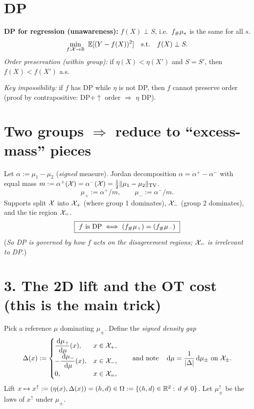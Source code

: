 \documentclass[11pt]{article}
\begin{document}
\section{DP}
\textbf{DP for regression (unawareness):} $f(X)\perp S$,
i.e.\ $f_{\#}\mu_s$ is the same for all $s$.
\begin{equation}
\min_{f:\X\to\R}\ \E[(Y-f(X))^2]\quad\text{s.t.}\quad f(X)\perp S.
\end{equation}
\emph{Order preservation (within group):} if $\eta(X)<\eta(X')$ and $S=S'$, then $f(X)<f(X')$ a.s.

\medskip
\textit{Key impossibility:} if $f$ has DP while $\eta$ is not DP, then $f$ cannot preserve order (proof by contrapositive: DP+$\uparrow$ order $\Rightarrow$ $\eta$ DP).

\section{Two groups $\Rightarrow$ reduce to ``excess-mass'' pieces}
Let $\alpha:=\mu_1-\mu_2$ (\emph{signed} measure). Jordan decomposition $\alpha=\alpha^+-\alpha^-$ with equal mass $m:=\alpha^+(\mathcal{X})=\alpha^-(\mathcal{X})=\tfrac12\|\mu_1-\mu_2\|_{\operatorname{TV}}$.
\begin{equation}
\mu_+:=\alpha^+/m,\qquad \mu_-:=\alpha^-/m.
\end{equation}
Supports split $\mathcal{X}$ into $\mathcal{X}_+$ (where group 1 dominates), $\mathcal{X}_-$ (group 2 dominates), and the tie region $\mathcal{X}_=$.
\begin{equation}
\boxed{~f\ \text{is DP} \iff (f_{\#}\mu_+)=(f_{\#}\mu_-)~}
\end{equation}
(\emph{So DP is governed by how $f$ acts on the disagreement regions; $\mathcal{X}_=$ is irrelevant to DP}.)

\section*{3. The 2D lift and the OT cost (this is the main trick)}
Pick a reference $\mu$ dominating $\mu_\pm$. Define the \emph{signed density gap}
\begin{equation}
\Delta(x):=\begin{cases}
\dfrac{\,\mathrm{d}\mu_+}{\,\mathrm{d}\mu}(x), & x\in\mathcal{X}_+,\\[4pt]
-\dfrac{\,\mathrm{d}\mu_-}{\,\mathrm{d}\mu}(x), & x\in\mathcal{X}_-,\\
0, & x\in\mathcal{X}_=,
\end{cases}
\qquad\text{and note}\quad
\,\mathrm{d}\mu=\frac{1}{|\Delta|}\,\mathrm{d}\mu_\pm\ \text{on }\mathcal{X}_\pm.
\end{equation}
Lift $x\mapsto x^{\uparrow}:=(\eta(x),\Delta(x))=(h,d)\in\Omega:=\{(h,d)\in\mathbb{R}^2:\,d\neq 0\}$.
Let $\mu_\pm^{\uparrow}$ be the laws of $x^\uparrow$ under $\mu_\pm$.
\end{document}
